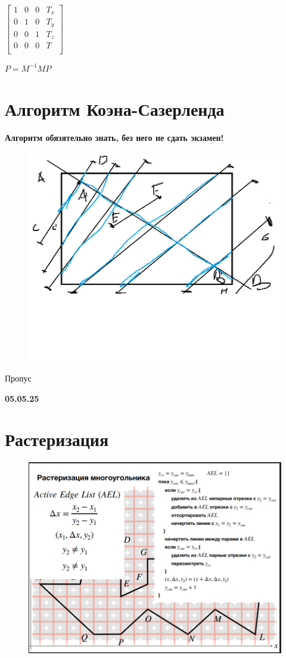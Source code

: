 \documentclass{article}
\begin{document}
$\begin{bmatrix}
    1 & 0 & 0 & T_x \\
    0 & 1 & 0 & T_y \\
    0 & 0 & 1 & T_z \\
    0 & 0 & 0 & T \\ 
\end{bmatrix} $

$P=M^{-1}MP$



\section{Алгоритм Коэна-Сазерленда}

\textbf{Алгоритм обязятельно знать, без него не сдать экзамен!}


\begin{figure} [H]
    \includegraphics[width=0.70\linewidth]{отс.png}
\end{figure}



\vspace{5mm}

Пропус

\vspace{5mm}

\textbf{05.05.25}

\section{Растеризация}


\begin{figure} [H]
    \includegraphics[width=0.70\linewidth]{Снимок экрана 2025-05-05 121851.png}
\end{figure}
\end{document}

